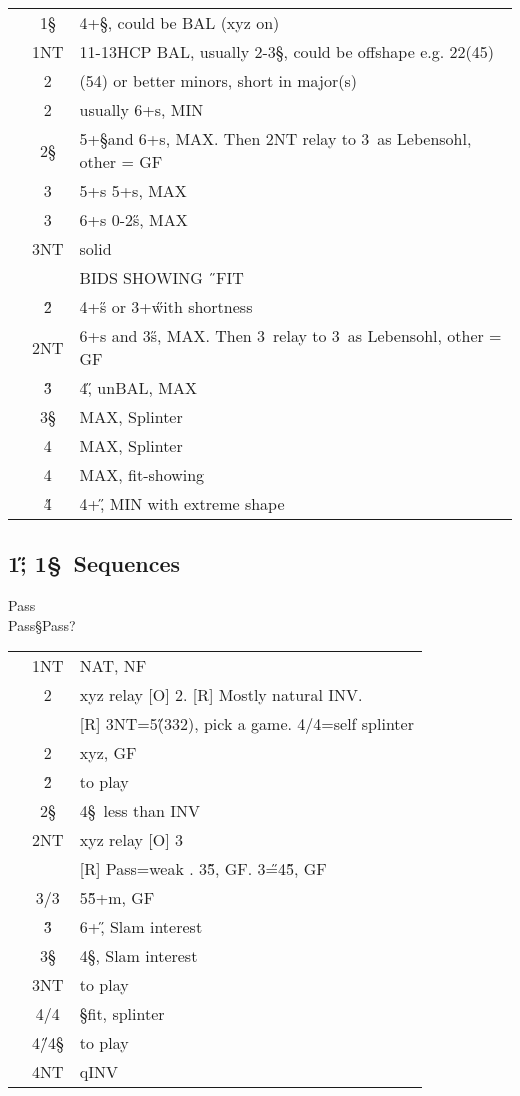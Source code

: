\begin{longtable}{C{\linklength} C{\bidlength} l}
& 1\S & 4+\S, could be BAL (xyz on)\\
& 1NT & 11-13HCP BAL, usually 2-3\S, could be offshape e.g. 22(45) \\
& 2\C & (54) or better minors, short in major(s) \\
& 2\D & usually 6+\D s, MIN \\
& 2\S & 5+\S and 6+\D s, MAX. Then 2NT relay to 3\C\ as Lebensohl, other = GF \\
& 3\C & 5+\D s 5+\C s, MAX \\
& 3\D & 6+\D s 0-2\H s, MAX \\
& 3NT & solid \D \\
\hline 
&     & BIDS SHOWING \H\ FIT \\
& 2\H & 4+\H s or 3+\H with shortness \\
& 2NT & 6+\D s and 3\H s, MAX. Then 3\C\ relay to 3\D\ as Lebensohl, other = GF  \\
& 3\H & 4\H, unBAL, MAX \\
& 3\S & MAX, Splinter \\
& 4\C & MAX, Splinter \\
& 4\D & MAX, fit-showing \\
& 4\H & 4+\H, MIN with extreme shape \\
\end{longtable}

\subsection{1\H; 1\S\ Sequences}

\begin{bidding}
\>\D\>Pass\H\\
\>Pass\S\>Pass\>?\\
\end{bidding}

\begin{longtable}{C{\linklength} C{\bidlength} l}
& 1NT & NAT, NF \\
& 2\C & xyz relay [O] 2\D. [R] Mostly natural INV. \\
& & [R] 3NT=5\H(332), pick a game. 4\C/4\D=self splinter \\
& 2\D & xyz, GF \\
& 2\H & to play \\
& 2\S & 4\S\ less than INV \\
& 2NT & xyz relay [O] 3\C \\
&     & [R] Pass=weak \C. 3\H5\D, GF. 3\H=4\H5\C, GF \\
& 3\C/3\D & 5\H5+m, GF \\
& 3\H & 6+\H, Slam interest \\
& 3\S & 4\S, Slam interest \\
& 3NT & to play\\
& 4\C/4\D & \S fit, splinter \\
& 4\H/4\S &to play\\
& 4NT & qINV \\
\end{longtable}

